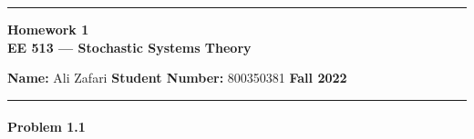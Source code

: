 \documentclass[12pt, letterpaper]{scrartcl}
\begin{document}
    \begin{center}
    	\hrule
    	\vspace{0.4cm}
    	{\textbf { {\large Homework 1} \\ EE 513 --- Stochastic Systems Theory}}
    \end{center}
    { \textbf{Name:} Ali Zafari \hspace{\fill} \textbf{Student Number:} 800350381 \hspace{\fill} \textbf{Fall 2022} } \newline\hrule

\paragraph*{Problem 1.1} \hfill
\end{document}

